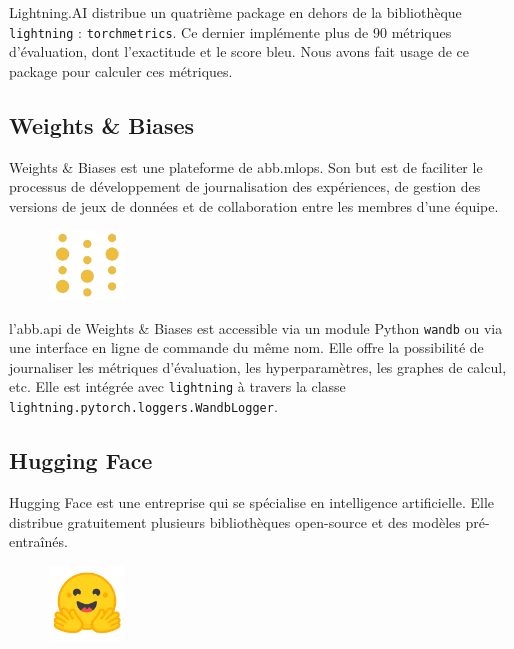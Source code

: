 \foreignlanguage{english}{Lightning.AI} distribue un quatrième package en dehors de la bibliothèque \verb|lightning| :
\verb|torchmetrics|.
Ce dernier implémente plus de 90 métriques d'évaluation, dont l'exactitude et le score \gls{bleu}.
Nous avons fait usage de ce package pour calculer ces métriques.

\subsection{\foreignlanguage{english}{Weights \& Biases}}%
\label{subsec.wandb}

\foreignlanguage{english}{Weights \& Biases} est une plateforme de \gls{abb.mlops}.
Son but est de faciliter le processus de développement de journalisation des expériences,
de gestion des versions de jeux de données et de collaboration entre les membres d'une équipe.
\begin{figure}
    \begin{flushright}
        \includegraphics[width=2cm]{assets/images/wandb.png}
    \end{flushright}
\end{figure}

l'\gls{abb.api} de \foreignlanguage{english}{Weights \& Biases} est accessible via un module Python \verb|wandb|
ou via une interface en ligne de commande du même nom.
Elle offre la possibilité de journaliser les métriques d'évaluation, les hyperparamètres, les graphes de calcul, etc.
Elle est intégrée avec \verb|lightning| à travers la classe \verb|lightning.pytorch.loggers.WandbLogger|.

\subsection{\foreignlanguage{english}{Hugging Face}}%
\label{subsec.huggingface}

\foreignlanguage{english}{Hugging Face} est une entreprise qui se spécialise en intelligence artificielle.
Elle distribue gratuitement plusieurs bibliothèques open-source et des modèles pré-entraînés.
\begin{figure}
    \vspace*{-\topsep}
    \begin{flushright}
        \includegraphics[width=2cm]{assets/images/huggingface.png}
    \end{flushright}
\end{figure}

